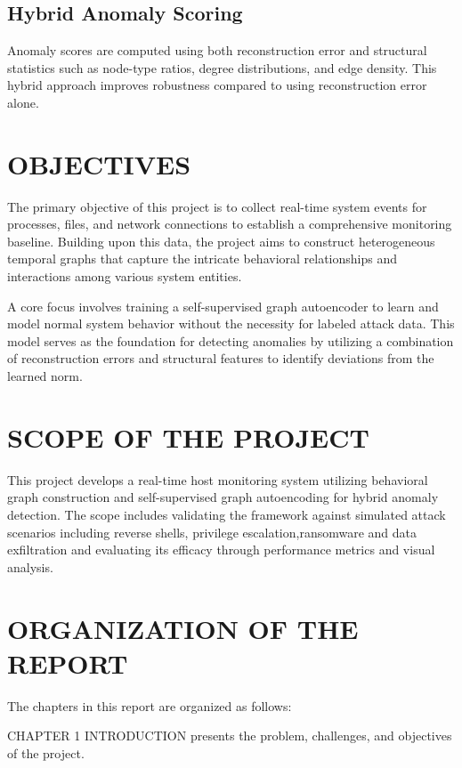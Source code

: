 \subsection{Hybrid Anomaly Scoring}
Anomaly scores are computed using both reconstruction error and structural
statistics such as node-type ratios, degree distributions, and edge density. This
hybrid approach improves robustness compared to using reconstruction error alone.

\section{OBJECTIVES}
The primary objective of this project is to collect real-time system events for 
processes, files, and network connections to establish a comprehensive monitoring 
baseline. Building upon this data, the project aims to construct heterogeneous 
temporal graphs that capture the intricate behavioral relationships and 
interactions among various system entities.

A core focus involves training a self-supervised graph autoencoder to learn and 
model normal system behavior without the necessity for labeled attack data. This 
model serves as the foundation for detecting anomalies by utilizing a combination 
of reconstruction errors and structural features to identify deviations from the 
learned norm.


\section{SCOPE OF THE PROJECT}
This project develops a real-time host monitoring system utilizing behavioral graph construction and self-supervised graph autoencoding for hybrid anomaly detection. The scope includes validating the framework against simulated attack scenarios including reverse shells, privilege escalation,ransomware and data exfiltration and evaluating its efficacy through performance metrics and visual analysis.





\section{ORGANIZATION OF THE REPORT}
The chapters in this report are organized as follows:

\vspace{0.6em}
CHAPTER 1 INTRODUCTION presents the problem, challenges, and objectives of the
project.


